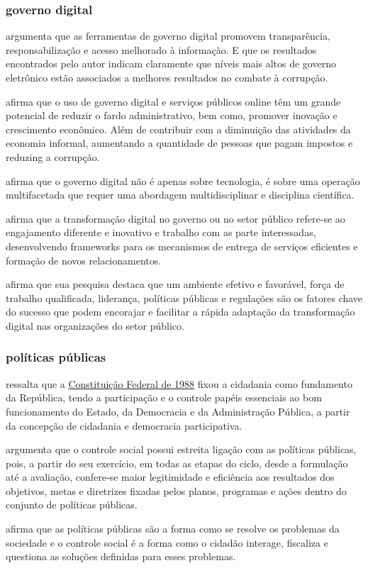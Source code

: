 \subsubsection{governo digital}

\cite{martins2018war} argumenta que as ferramentas de governo digital promovem transparência, responsabilização e acesso melhorado à informação. E que os resultados encontrados pelo autor indicam claramente que níveis mais altos de governo eletrônico estão associados a melhores resultados no combate à corrupção.

\cite{veiga2016digital} afirma que o uso de governo digital e serviços públicos online têm um grande potencial de reduzir o fardo administrativo, bem como, promover inovação e crescimento econômico. Além de contribuir com a diminuição das atividades da economia informal, aumentando a quantidade de pessoas que pagam impostos e reduzing a corrupção.

\cite{veiga2016digital} afirma que o governo digital não é apenas sobre tecnologia, é sobre uma operação multifacetada  que requer uma abordagem multidisciplinar e disciplina científica.

\cite{alenezi2022understanding} afirma que a transformação digital no governo ou no setor público refere-se ao engajamento diferente e inovativo e trabalho com as parte interessadas, desenvolvendo frameworks para os mecanismos de entrega de serviços eficientes e formação de novos relacionamentos.

\cite{alenezi2022understanding} afirma que sua pesquisa destaca que um ambiente efetivo e favorável, força de trabalho qualificada, liderança, políticas públicas e regulações são os fatores chave do sucesso que podem encorajar e facilitar a rápida adaptação da transformação digital nas organizações do setor público.

\subsubsection{políticas públicas}

\cite{tavares2022governo} ressalta que a \href{https://www.planalto.gov.br/ccivil_03/constituicao/constituicao.htm}{Constituição Federal de 1988} fixou a cidadania como fundamento da República, tendo a participação e o controle papéis essenciais ao bom funcionamento do Estado, da Democracia e da Administração Pública, a partir da concepção de cidadania e democracia participativa.

\cite{tavares2022governo} argumenta que o controle social possui estreita ligação com as políticas públicas, pois, a partir do seu exercício, em todas as etapas do ciclo, desde a formulação até a avaliação, confere-se maior legitimidade e eficiência aos resultados dos objetivos, metas e diretrizes fixadas pelos planos, programas e ações dentro do conjunto de políticas públicas.

\cite{tavares2022governo} afirma que as políticas públicas são a forma como se resolve os problemas da sociedade e o controle social é a forma como o cidadão interage, fiscaliza e questiona as soluções definidas para esses problemas. 
